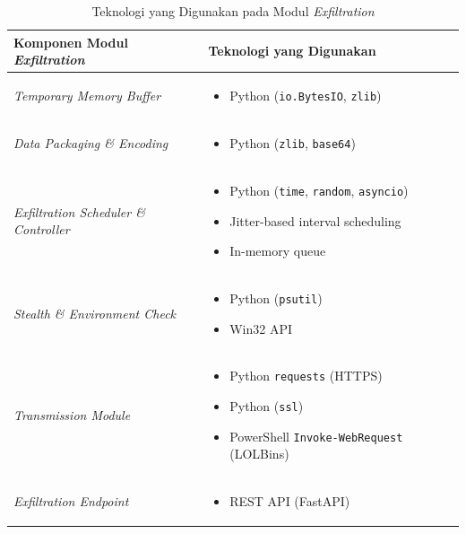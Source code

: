 \begin{table}[H]
\captionsetup{justification=raggedright,singlelinecheck=false}
\centering
\renewcommand{\arraystretch}{1.35}
\begin{tabular}{|p{5cm}|p{8cm}|}
\hline
\textbf{Komponen Modul \textit{Exfiltration}} & \textbf{Teknologi yang Digunakan} \\
\hline

\textit{Temporary Memory Buffer} &
\begin{itemize}[leftmargin=*]
    \item Python (\texttt{io.BytesIO}, \texttt{zlib})
\end{itemize}
\\
\hline

\textit{Data Packaging \& Encoding} &
\begin{itemize}[leftmargin=*]
    \item Python (\texttt{zlib}, \texttt{base64})
\end{itemize}
\\
\hline

\textit{Exfiltration Scheduler \& Controller} &
\begin{itemize}[leftmargin=*]
    \item Python (\texttt{time}, \texttt{random}, \texttt{asyncio})
    \item Jitter-based interval scheduling
    \item In-memory queue
\end{itemize}
\\
\hline

\textit{Stealth \& Environment Check} &
\begin{itemize}[leftmargin=*]
    \item Python (\texttt{psutil})
    \item Win32 API
\end{itemize}
\\
\hline

\textit{Transmission Module} &
\begin{itemize}[leftmargin=*]
    \item Python \texttt{requests} (HTTPS)
    \item Python (\texttt{ssl})
    \item PowerShell \texttt{Invoke-WebRequest} (LOLBins)
\end{itemize}
\\
\hline

\textit{Exfiltration Endpoint} &
\begin{itemize}[leftmargin=*]
    \item REST API (FastAPI)
\end{itemize}
\\
\hline

\end{tabular}
\caption{Teknologi yang Digunakan pada Modul \textit{Exfiltration}}
\label{tbl:teknologi-modul-exfiltration}
\end{table}
